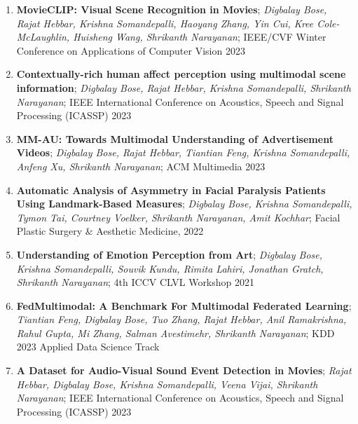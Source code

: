 
\begin{enumerate}
\item \textbf{MovieCLIP: Visual Scene Recognition in Movies}; \textit{Digbalay Bose, Rajat Hebbar, Krishna Somandepalli, Haoyang Zhang, Yin Cui, Kree Cole-McLaughlin, Huisheng Wang, Shrikanth Narayanan}; IEEE/CVF Winter Conference on Applications of Computer Vision 2023

\item  \textbf{Contextually-rich human affect perception using multimodal scene information}; \textit{Digbalay Bose, Rajat Hebbar, Krishna Somandepalli, Shrikanth Narayanan}; IEEE International Conference on Acoustics, Speech and Signal Processing (ICASSP) 2023

\item \textbf{MM-AU: Towards Multimodal Understanding of Advertisement Videos}; \textit{Digbalay Bose, Rajat Hebbar, Tiantian Feng, Krishna Somandepalli, Anfeng Xu, Shrikanth Narayanan}; ACM Multimedia 2023

\item \textbf{Automatic Analysis of Asymmetry in Facial Paralysis Patients Using Landmark-Based Measures}; \textit{Digbalay Bose, Krishna Somandepalli, Tymon Tai, Courtney Voelker, Shrikanth Narayanan, Amit Kochhar}; Facial Plastic Surgery \& Aesthetic Medicine, 2022

\item \textbf{Understanding of Emotion Perception from Art}; \textit{Digbalay Bose, Krishna Somandepalli, Souvik Kundu, Rimita Lahiri, Jonathan Gratch, Shrikanth Narayanan}; 4th ICCV CLVL Workshop 2021

\item \textbf{FedMultimodal: A Benchmark For Multimodal Federated Learning}; \textit{Tiantian Feng, Digbalay Bose, Tuo Zhang, Rajat Hebbar, Anil Ramakrishna, Rahul Gupta, Mi Zhang, Salman Avestimehr, Shrikanth Narayanan}; KDD 2023 Applied Data Science Track

\item \textbf{A Dataset for Audio-Visual Sound Event Detection in Movies}; \textit{Rajat Hebbar, Digbalay Bose, Krishna Somandepalli, Veena Vijai, Shrikanth Narayanan}; IEEE International Conference on Acoustics, Speech and Signal Processing (ICASSP) 2023

\end{enumerate}



